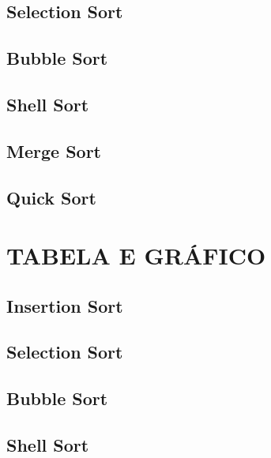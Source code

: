 \documentclass[12pt,arial]{article}
\begin{document}
		\subsection{Selection Sort}
		
	    \newpage

		\subsection{Bubble Sort}
		
	    \newpage

		\subsection{Shell Sort}
		
		\newpage

		\subsection{Merge Sort}
		
	    \newpage

		\subsection{Quick Sort}
		
	    \newpage

		\section{TABELA E GRÁFICO}
            \subsection{Insertion Sort}
		
		\newpage

		\subsection{Selection Sort}
		
		\newpage

		\subsection{Bubble Sort}
		
		\newpage

		\subsection{Shell Sort}
		
		\newpage
\end{document}
